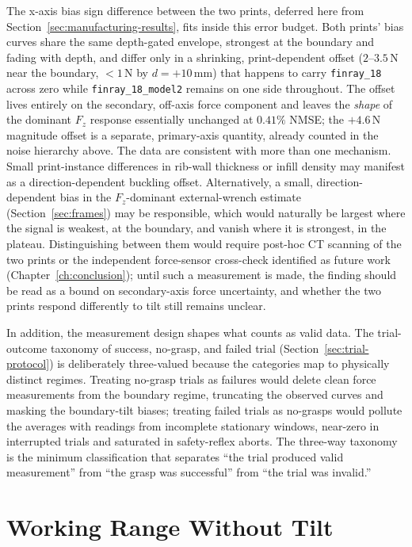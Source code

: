 The x-axis bias sign difference between the two prints, deferred here
from Section~\ref{sec:manufacturing-results}, fits inside this error
budget. Both prints' bias curves share the same
depth-gated envelope, strongest at the boundary and fading with depth,
and differ only in a shrinking, print-dependent offset ($2$--$3.5$\,N
near the boundary, $<1$\,N by $d=+10$\,mm) that happens to carry
\texttt{finray\_18} across zero while \texttt{finray\_18\_model2}
remains on one side throughout. The offset lives entirely on the
secondary, off-axis force component and leaves the \emph{shape} of the
dominant $F_z$ response essentially unchanged at $0.41\%$ NMSE; the
$+4.6$\,N magnitude offset is a separate, primary-axis quantity,
already counted in the noise hierarchy above. The data are consistent
with more than one mechanism. Small print-instance differences in
rib-wall thickness or infill density may manifest as a
direction-dependent buckling offset. Alternatively, a small,
direction-dependent bias in the $F_z$-dominant external-wrench estimate
(Section~\ref{sec:frames}) may be responsible, which would naturally be
largest where the signal is weakest, at the boundary, and vanish where
it is strongest, in the plateau. Distinguishing between them would
require post-hoc CT scanning of the two prints or the independent
force-sensor cross-check identified as future work
(Chapter~\ref{ch:conclusion}); until such a measurement is made, the
finding should be read as a bound on secondary-axis force uncertainty,
and whether the two prints respond differently to tilt still remains
unclear.

In addition, the measurement design shapes what counts as valid data.
The trial-outcome taxonomy of success, no-grasp, and failed trial
(Section~\ref{sec:trial-protocol}) is deliberately three-valued
because the categories map to physically distinct regimes. Treating
no-grasp trials as failures would delete clean force measurements from
the boundary regime, truncating the observed curves and masking the
boundary-tilt biases; treating failed trials as no-grasps would
pollute the averages with readings from incomplete stationary windows,
near-zero in interrupted trials and saturated in safety-reflex aborts.
The three-way taxonomy is the minimum classification that
separates ``the trial produced valid measurement'' from ``the grasp
was successful'' from ``the trial was invalid.''

\section{Working Range Without Tilt}
\label{sec:working-range-discussion}
\label{sec:failure-mode-discussion}

